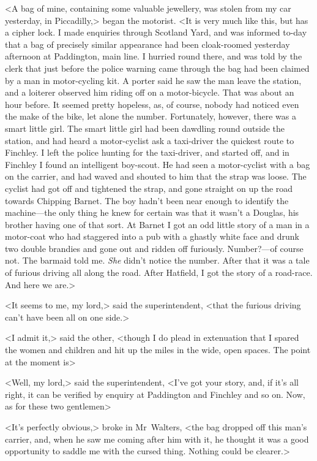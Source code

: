 <A bag of mine, containing some valuable jewellery, was stolen from my car yesterday, in Piccadilly,> began the motorist. <It is very much like this, but has a cipher lock. I made enquiries through Scotland Yard, and was informed to-day that a bag of precisely similar appearance had been cloak-roomed yesterday afternoon at Paddington, main line. I hurried round there, and was told by the clerk that just before the police warning came through the bag had been claimed by a man in motor-cycling kit. A porter said he saw the man leave the station, and a loiterer observed him riding off on a motor-bicycle. That was about an hour before. It seemed pretty hopeless, as, of course, nobody had noticed even the make of the bike, let alone the number. Fortunately, however, there was a smart little girl. The smart little girl had been dawdling round outside the station, and had heard a motor-cyclist ask a taxi-driver the quickest route to Finchley. I left the police hunting for the taxi-driver, and started off, and in Finchley I found an intelligent boy-scout. He had seen a motor-cyclist with a bag on the carrier, and had waved and shouted to him that the strap was loose. The cyclist had got off and tightened the strap, and gone straight on up the road towards Chipping Barnet. The boy hadn't been near enough to identify the machine—the only thing he knew for certain was that it wasn't a Douglas, his brother having one of that sort. At Barnet I got an odd little story of a man in a motor-coat who had staggered into a pub with a ghastly white face and drunk two double brandies and gone out and ridden off furiously. Number?—of course not. The barmaid told me. \textit{She} didn't notice the number. After that it was a tale of furious driving all along the road. After Hatfield, I got the story of a road-race. And here we are.>

<It seems to me, my lord,> said the superintendent, <that the furious driving can't have been all on one side.>

<I admit it,> said the other, <though I do plead in extenuation that I spared the women and children and hit up the miles in the wide, open spaces. The point at the moment is\longdash>

<Well, my lord,> said the superintendent, <I've got your story, and, if it's all right, it can be verified by enquiry at Paddington and Finchley and so on. Now, as for these two gentlemen\longdash>

<It's perfectly obvious,> broke in Mr~Walters, <the bag dropped off this man's carrier, and, when he saw me coming after him with it, he thought it was a good opportunity to saddle me with the cursed thing. Nothing could be clearer.>

